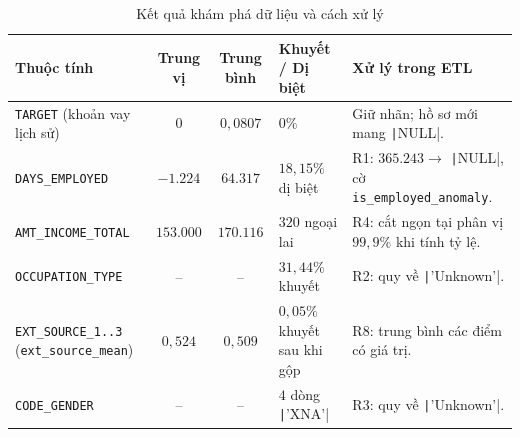 \begin{table}[H]
	\centering
	\caption{Kết quả khám phá dữ liệu và cách xử lý}
	\label{tab:eda-summary}
	\footnotesize
	\begin{tabular}{p{3.6cm} c c p{2.6cm} p{5.2cm}}
		\toprule
		\textbf{Thuộc tính}                                     & \textbf{Trung vị} & \textbf{Trung bình} & \textbf{Khuyết / Dị biệt}                                & \textbf{Xử lý trong ETL}                                                                                     \\
		\midrule
		\texttt{TARGET} (khoản vay lịch sử)                     & $0$               & $0{,}0807$          & $0\%$                                                    & Giữ nhãn; hồ sơ mới mang \texttt|NULL|.                                     \\
		\texttt{DAYS\_EMPLOYED}                                 & $-1.224$          & $64.317$            & $18{,}15\%$ dị biệt                                      & R1: $365.243 \rightarrow$ \texttt|NULL|, cờ \texttt{is\_employed\_anomaly}. \\
		\texttt{AMT\_INCOME\_TOTAL}                             & $153.000$         & $170.116$           & $320$ ngoại lai                                          & R4: cắt ngọn tại phân vị $99{,}9\%$ khi tính tỷ lệ.                                                          \\
		\texttt{OCCUPATION\_TYPE}                               & --                & --                  & $31{,}44\%$ khuyết                                       & R2: quy về \texttt|'Unknown'|.                                              \\
		\texttt{EXT\_SOURCE\_1..3} (\texttt{ext\_source\_mean}) & $0{,}524$         & $0{,}509$           & $0{,}05\%$ khuyết sau khi gộp                            & R8: trung bình các điểm có giá trị.                                                                          \\
		\texttt{CODE\_GENDER}                                   & --                & --                  & $4$ dòng \texttt|'XNA'| & R3: quy về \texttt|'Unknown'|.                                              \\
		\bottomrule
	\end{tabular}
\end{table}

